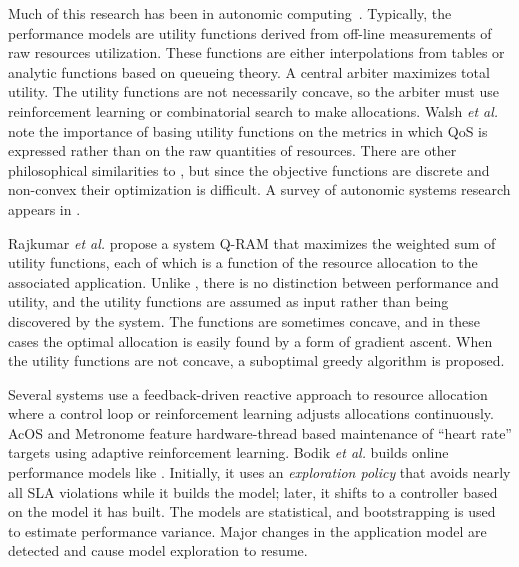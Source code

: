 Much of this research has been in autonomic computing~\cite{1078472,1078493,1285843,1345325}. Typically, the performance models are utility functions derived from off-line measurements of raw resources utilization. These functions are either interpolations from tables or analytic functions based on queueing theory.
A central arbiter maximizes total utility. The utility functions are not necessarily concave,
so the arbiter must use reinforcement learning or combinatorial search to make allocations.
Walsh \emph{et al.}\cite{1078411} note the importance of basing utility functions
on the metrics in which QoS is expressed rather than on the raw quantities of resources.
There are other philosophical similarities to \pacora, but since the objective functions are discrete and non-convex their optimization is difficult. A survey of autonomic systems research appears in \cite{1380585}.

Rajkumar \emph{et al.}\cite{828990} propose a system Q-RAM that maximizes the weighted sum of utility functions, each of which is a function of the resource allocation to the associated application. Unlike \pacora, there is no distinction between performance and utility, and the utility functions are assumed as input rather than being discovered by the system. The functions are sometimes concave, and in these cases the optimal allocation is easily found by a form of gradient ascent. When the utility functions are not concave, a suboptimal greedy algorithm is proposed.

Several systems use a feedback-driven reactive approach to resource allocation where a control loop or reinforcement learning adjusts allocations continuously. AcOS\cite{AcOS} and Metronome\cite{Metronome} feature hardware-thread based maintenance of ``heart rate'' targets using adaptive reinforcement learning.
Bodik \emph{et al.}\cite{bodik-acdc09} builds online performance models like \pacora.
Initially, it uses an \emph{exploration policy} that avoids nearly all SLA violations while it builds the model; later, it shifts to a controller based on the model it has built.
The models are statistical, and bootstrapping is used to estimate performance variance.
Major changes in the application model are detected and cause model exploration to resume.

